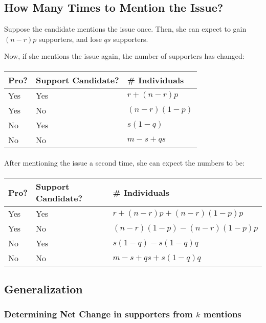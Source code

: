 \documentclass{article}
\begin{document}
\subsection{How Many Times to Mention the Issue?}

Suppose the candidate mentions the issue once.
Then, she can expect to gain $ (n-r) p$ supporters,	
	and lose $ q s $ supporters.

Now, if she mentions the issue again, the number of supporters
	has changed:

\paragraph{}
\begin{tabular}{|l|l|l|}
\hline
Pro? & Support Candidate? & \# Individuals\\
\hline
Yes & Yes & $r + (n - r) p$ \\
Yes & No & $(n-r)(1-p)$ \\
No & Yes & $s(1 - q)$ \\
No & No & $m-s + q s$ \\
\hline
\end{tabular}

\paragraph{}
After mentioning the issue a second time, she can expect the numbers to be:

\paragraph{}
\begin{tabular}{|l|l|l|}
\hline
Pro? & Support Candidate? & \# Individuals\\
\hline
Yes & Yes & $r + (n - r) p + (n-r)(1-p)p$ \\
Yes & No & $(n-r)(1-p) - (n-r)(1-p)p$ \\
No & Yes & $s(1 - q) - s(1-q)q$ \\
No & No & $m-s + q s + s(1-q)q$ \\
\hline
\end{tabular}

\subsection{Generalization}

\subsubsection{Determining Net Change in supporters from $k$ mentions}
\end{document}

